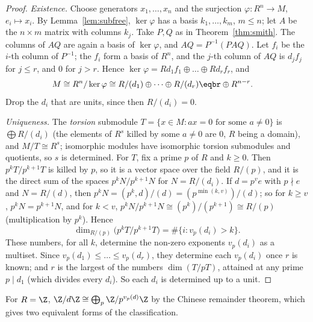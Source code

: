 \begin{proof}
\emph{Existence.} Choose generators $x_1,\dots,x_n$ and the surjection $\varphi:R^n\to M$, $e_i\mapsto x_i$. By Lemma~\ref{lem:subfree}, $\ker\varphi$ has a basis $k_1,\dots,k_m$, $m\le n$; let $A$ be the $n\times m$ matrix with columns $k_j$. Take $P,Q$ as in Theorem~\ref{thm:smith}. The columns of $AQ$ are again a basis of $\ker\varphi$, and $AQ=P^{-1}(PAQ)$. Let $f_i$ be the $i$-th column of $P^{-1}$; the $f_i$ form a basis of $R^n$, and the $j$-th column of $AQ$ is $d_jf_j$ for $j\le r$, and $0$ for $j>r$. Hence $\ker\varphi=Rd_1f_1\oplus\dots\oplus Rd_rf_r$, and
\[
\begin{aligned}M\cong R^n/\ker\varphi&\cong R/(d_1)\oplus\dots\oplus R/(d_r)\eqbr\oplus R^{n-r}.\end{aligned}
\]
Drop the $d_i$ that are units, since then $R/(d_i)=0$.

\emph{Uniqueness.} The \emph{torsion} submodule $T=\{x\in M:ax=0\text{ for some }a\ne0\}$ is $\bigoplus R/(d_i)$ (the elements of $R^s$ killed by some $a\ne0$ are $0$, $R$ being a domain), and $M/T\cong R^s$; isomorphic modules have isomorphic torsion submodules and quotients, so $s$ is determined. For $T$, fix a prime $p$ of $R$ and $k\ge0$. Then $p^kT/p^{k+1}T$ is killed by $p$, so it is a vector space over the field $R/(p)$, and it is the direct sum of the spaces $p^kN/p^{k+1}N$ for $N=R/(d_i)$. If $d=p^ve$ with $p\nmid e$ and $N=R/(d)$, then $p^kN=(p^k,d)/(d)=(p^{\min(k,v)})/(d)$; so for $k\ge v$, $p^kN=p^{k+1}N$, and for $k<v$, $p^kN/p^{k+1}N\cong(p^k)/(p^{k+1})\cong R/(p)$ (multiplication by $p^k$). Hence
\[
\dim_{R/(p)}\bigl(p^kT/p^{k+1}T\bigr)=\#\{i:v_p(d_i)>k\}.
\]
These numbers, for all $k$, determine the non-zero exponents $v_p(d_i)$ as a multiset. Since $v_p(d_1)\le\dots\le v_p(d_r)$, they determine each $v_p(d_i)$ once $r$ is known; and $r$ is the largest of the numbers $\dim(T/pT)$, attained at any prime $p\mid d_1$ (which divides every $d_i$). So each $d_i$ is determined up to a unit.
\end{proof}

For $R=\Z$, $\Z/d\Z\cong\bigoplus_p\Z/p^{v_p(d)}\Z$ by the Chinese remainder theorem, which gives two equivalent forms of the classification.

